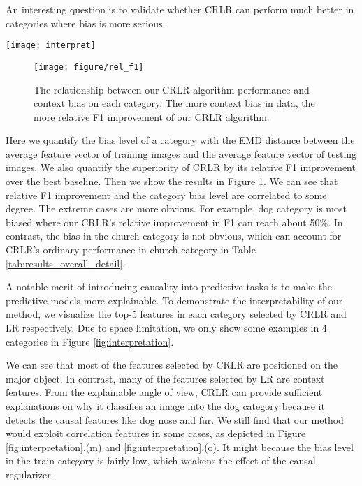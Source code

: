 \documentclass[sigconf]{acmart}
\begin{document}
An interesting question is to validate whether CRLR can perform much better in categories where bias is more serious.

\begin{figure*}[tbp]
\centering
\texttt{[image: interpret]}
\vspace{-0.1in}
\caption{Top 5 features selected by CRLR and Logistic Regression, the red boxes indicate the features that CRLR selects and the green boxes indicate the features that Logistic Regression selects. Note that each feature represents a visual word and may correspond to multiple bounding boxes, so the number of red and green boxes may not be equal.}
\label{fig:interpretation}
\end{figure*}\begin{figure}[h]
\texttt{[image: figure/rel\_f1]}
\caption{The relationship between our CRLR algorithm performance and context bias on each category. The more context bias in data, the more relative F1 improvement of our CRLR algorithm.}
\label{fig:bias_relation}
\end{figure}
Here we quantify the bias level of a category with the EMD distance between the average feature vector of training images and the average feature vector of testing images.
We also quantify the superiority of CRLR by its relative F1 improvement over the best baseline.
Then we show the results in Figure \ref{fig:bias_relation}.
We can see that relative F1 improvement and the category bias level are correlated to some degree.
The extreme cases are more obvious.
For example, dog category is most biased where our CRLR's relative improvement in F1 can reach about 50\%.
In contrast, the bias in the church category is not obvious, which can account for CRLR's ordinary performance in church category in Table \ref{tab:results_overall_detail}.

A notable merit of introducing causality into predictive tasks is to make the predictive models more explainable.
To demonstrate the interpretability of our method, we visualize the top-5 features in each category selected by CRLR and LR respectively.
Due to space limitation, we only show some examples in 4 categories in Figure \ref{fig:interpretation}.

We can see that most of the features selected by CRLR are positioned on the major object.
In contrast, many of the features selected by LR are context features.
From the explainable angle of view, CRLR can provide sufficient explanations on why it classifies an image into the dog category because it detects the causal features like dog nose and fur.
We still find that our method would exploit correlation features in some cases, as depicted in Figure \ref{fig:interpretation}.(m) and \ref{fig:interpretation}.(o).
It might because the bias level in the train category is fairly low, which weakens the effect of the causal regularizer.
\end{document}
